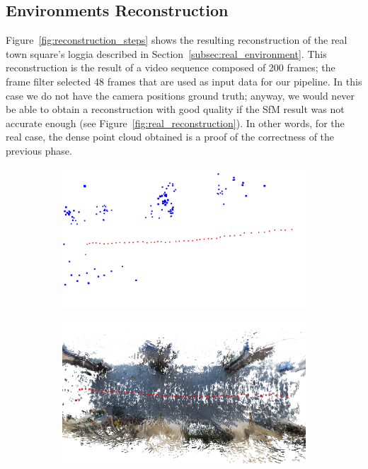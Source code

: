 \subsection{Environments Reconstruction}
Figure~\ref{fig:reconstruction_steps} shows the resulting reconstruction of the
real town square's loggia described in Section~\ref{subsec:real_environment}.
This reconstruction is the result of a video sequence composed of 200 frames;
the frame filter selected 48 frames that are used as input data for our
pipeline.
In this case we do not have the camera positions ground truth; anyway, we
would never be able to obtain a reconstruction with good quality
if the SfM result was not accurate enough (see Figure~\ref{fig:real_reconstruction}). In other words, for the real case, the dense point
cloud obtained is a proof of the correctness of the previous phase.
%
\begin{figure}[h]
\centering
	\begin{subfigure}{0.45\linewidth}
		\centering
		\includegraphics[width=\linewidth]{img/real2.png}
	\end{subfigure}
	\begin{subfigure}{0.45\linewidth}
		\centering
		\includegraphics[width=\linewidth]{img/real3.png}

\end{subfigure}
\end{figure}
